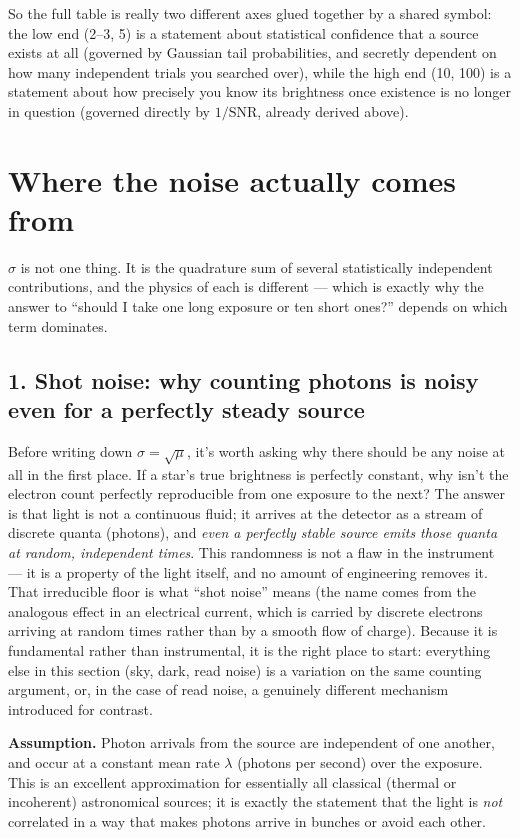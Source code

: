 \documentclass[11pt]{article}
\begin{document}
So the full table is really two different axes glued together by a shared symbol: the low end (2--3, 5)
is a statement about statistical confidence that a source exists at all (governed by Gaussian tail
probabilities, and secretly dependent on how many independent trials you searched over), while the
high end (10, 100) is a statement about how precisely you know its brightness once existence is no
longer in question (governed directly by $1/\mathrm{SNR}$, already derived above).


\section*{Where the noise actually comes from}

$\sigma$ is not one thing. It is the quadrature sum of several statistically independent
contributions, and the physics of each is different --- which is exactly why the answer to ``should I
take one long exposure or ten short ones?'' depends on which term dominates.

\subsection*{1. Shot noise: why counting photons is noisy even for a perfectly steady source}

Before writing down $\sigma=\sqrt{\mu}$, it's worth asking why there should be any noise at all in the
first place. If a star's true brightness is perfectly constant, why isn't the electron count perfectly
reproducible from one exposure to the next? The answer is that light is not a continuous fluid; it
arrives at the detector as a stream of discrete quanta (photons), and \emph{even a perfectly stable
source emits those quanta at random, independent times}. This randomness is not a flaw in the
instrument --- it is a property of the light itself, and no amount of engineering removes it. That
irreducible floor is what ``shot noise'' means (the name comes from the analogous effect in an
electrical current, which is carried by discrete electrons arriving at random times rather than by a
smooth flow of charge). Because it is fundamental rather than instrumental, it is the right place to
start: everything else in this section (sky, dark, read noise) is a variation on the same counting
argument, or, in the case of read noise, a genuinely different mechanism introduced for contrast.

\textbf{Assumption.} Photon arrivals from the source are independent of one another, and occur at a
constant mean rate $\lambda$ (photons per second) over the exposure. This is an excellent approximation
for essentially all classical (thermal or incoherent) astronomical sources; it is exactly the
statement that the light is \emph{not} correlated in a way that makes photons arrive in bunches or
avoid each other.
\end{document}
